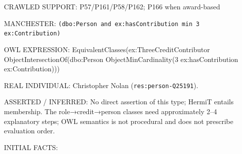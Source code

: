 \documentclass[
  11pt,
]{article}
\begin{document}
CRAWLED SUPPORT:
P57/\allowbreak{}\allowbreak{}P161\allowbreak{}/\allowbreak{}\allowbreak{}P58/\allowbreak{}\allowbreak{}P16\allowbreak{}2;
P166 when award-based

MANCHESTER:
\texttt{(dbo:\allowbreak{}\allowbreak{}Per\allowbreak{}son and \allowbreak{}ex:\allowbreak{}has\allowbreak{}Co\allowbreak{}ntributi\allowbreak{}on min 3\allowbreak{} ex:\allowbreak{}\allowbreak{}Cont\allowbreak{}ribution\allowbreak{})}

OWL EXPRESSION:
Equivale\allowbreak{}nt\allowbreak{}Classe\allowbreak{}s(ex:\allowbreak{}\allowbreak{}Thr\allowbreak{}ee\allowbreak{}Credit\allowbreak{}\allowbreak{}Contribu\allowbreak{}tor
Object\allowbreak{}In\allowbreak{}tersecti\allowbreak{}on\allowbreak{}Of(dbo\allowbreak{}:\allowbreak{}\allowbreak{}Person
Object\allowbreak{}Mi\allowbreak{}n\allowbreak{}Cardina\allowbreak{}lity(3
ex:\allowbreak{}has\allowbreak{}Co\allowbreak{}ntributi\allowbreak{}on
ex:\allowbreak{}\allowbreak{}Contr\allowbreak{}ibution)\allowbreak{}))

REAL INDIVIDUAL: Christopher Nolan
(\texttt{res:\allowbreak{}pers\allowbreak{}on-\allowbreak{}\allowbreak{}Q2519\allowbreak{}1}).

ASSERTED / INFERRED: No direct assertion of this type; HermiT entails
membership. The role→credit→person classes need
approxim\allowbreak{}ately 2--4 explanatory steps; OWL semantics is not
procedural and does not prescribe evaluation order.

INITIAL FACTS:
\end{document}

